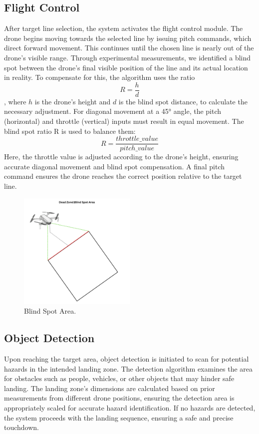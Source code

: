 \documentclass[unnumsec,webpdf,modern,large]{mam-authoring-template}%
\begin{document}
\subsection{Flight Control}
After target line selection, the system activates the flight control module. The drone begins moving towards the selected line by issuing pitch commands, which direct forward movement. This continues until the chosen line is nearly out of the drone’s visible range. Through experimental measurements, we identified a blind spot between the drone's final visible position of the line and its actual location in reality.
To compensate for this, the algorithm uses the ratio $$ R=\frac{h}{d}$$, where $h$ is the drone’s height and $d$ is the blind spot distance, to calculate the necessary adjustment.
For diagonal movement at a 45° angle, the pitch (horizontal) and throttle (vertical) inputs must result in equal movement. The blind spot ratio R is used to balance them: $$R = \frac{throttle\_value}{pitch\_value}$$ Here, the throttle value is adjusted according to the drone's height, ensuring accurate diagonal movement and blind spot compensation. A final pitch command ensures the drone reaches the correct position relative to the target line.

\begin{figure}[H]
    \centering
    \includegraphics[width=0.5\textwidth]{Blind Spot Area.png}
    \caption{Blind Spot Area.}
    \label{fig:Blind Spot Area.}
\end{figure}

\subsection{Object Detection}
Upon reaching the target area, object detection is initiated to scan for potential hazards in the intended landing zone. The detection algorithm examines the area for obstacles such as people, vehicles, or other objects that may hinder safe landing. The landing zone's dimensions are calculated based on prior measurements from different drone positions, ensuring the detection area is appropriately scaled for accurate hazard identification. If no hazards are detected, the system proceeds with the landing sequence, ensuring a safe and precise touchdown.
\end{document}
